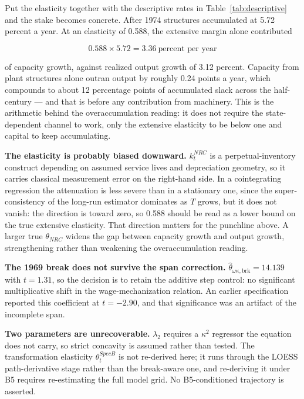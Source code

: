 \documentclass[11pt,a4paper]{article}
\begin{document}
Put the elasticity together with the descriptive rates in Table~\ref{tab:descriptive} and the stake becomes concrete. After 1974 structures accumulated at 5.72 percent a year. At an elasticity of 0.588, the extensive margin alone contributed

\begin{equation}
0.588 \times 5.72 = 3.36 \ \text{percent per year}
\end{equation}

of capacity growth, against realized output growth of 3.12 percent. Capacity from plant structures alone outran output by roughly 0.24 points a year, which compounds to about 12 percentage points of accumulated slack across the half-century --- and that is before any contribution from machinery. This is the arithmetic behind the overaccumulation reading: it does not require the state-dependent channel to work, only the extensive elasticity to be below one and capital to keep accumulating.

\textbf{The elasticity is probably biased downward.} $k^{NRC}_t$ is a perpetual-inventory construct depending on assumed service lives and depreciation geometry, so it carries classical measurement error on the right-hand side. In a cointegrating regression the attenuation is less severe than in a stationary one, since the super-consistency of the long-run estimator dominates as $T$ grows, but it does not vanish: the direction is toward zero, so 0.588 should be read as a lower bound on the true extensive elasticity. That direction matters for the punchline above. A larger true $\theta_{NRC}$ widens the gap between capacity growth and output growth, strengthening rather than weakening the overaccumulation reading.

\textbf{The 1969 break does not survive the span correction.} $\hat{\theta}_{\omega\kappa,\text{brk}} = 14.139$ with $t = 1.31$, so the decision is to retain the additive step control: no significant multiplicative shift in the wage-mechanization relation. An earlier specification reported this coefficient at $t = -2.90$, and that significance was an artifact of the incomplete span.

\textbf{Two parameters are unrecoverable.} $\lambda_2$ requires a $\kappa^2$ regressor the equation does not carry, so strict concavity is assumed rather than tested. The transformation elasticity $\theta^{SpecB}_t$ is not re-derived here; it runs through the LOESS path-derivative stage rather than the break-aware one, and re-deriving it under B5 requires re-estimating the full model grid. No B5-conditioned trajectory is asserted.
\end{document}
